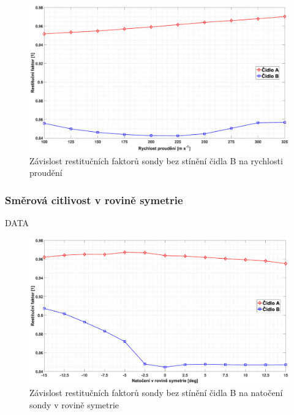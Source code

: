             \begin{figure}[ht!]
                \centering
                \includegraphics*[width=\textwidth, trim={5.9cm 1.0cm 5.7cm 2.0cm}]{400_SIMULACE_KONSTRUKCNICH_UPRAV/Grafy/01_rychlosti.eps}
                \caption{Závislost restitučních faktorů sondy bez stínění čidla B na rychlosti proudění}
                \label{fig:sonda-bez-stineni-rychlosti}
            \end{figure}
        \subsubsection{Směrová citlivost v rovině symetrie}
            DATA
            
            \begin{figure}[ht!]
                \centering
                \includegraphics*[width=\textwidth, trim={5.9cm 1.0cm 5.8cm 2.0cm}]{400_SIMULACE_KONSTRUKCNICH_UPRAV/Grafy/01_rovina_symetrie}
                \caption{Závislost restitučních faktorů sondy bez stínění čidla B na natočení sondy v rovině symetrie}
                \label{fig:sonda-bez-stineni-rovina-symetrie}
            \end{figure}
